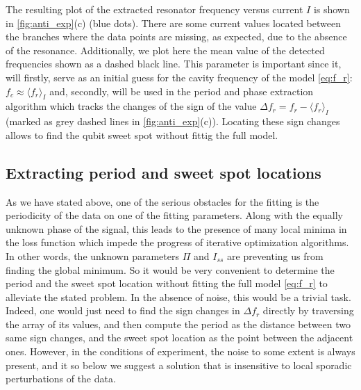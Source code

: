 \documentclass[%
 aip,
 draft,
 amsmath,amssymb,
 reprint,%
]{revtex4-1}
\begin{document}
The resulting plot of the extracted resonator frequency versus current $I$ is shown in \autoref{fig:anti_exp}(c) (blue dots). There are some current values located between the branches where the data points are missing, as expected, due to the absence of the resonance. Additionally, we plot here the mean value of the detected frequencies shown as a dashed black line. This parameter is important since it, will firstly, serve as an initial guess for the cavity frequency of the model \eqref{eq:f_r}: $f_c \approx \langle f_r \rangle_{I}$ and, secondly, will be used in the period and phase extraction algorithm which tracks the changes of the sign of the value $\Delta f_r = f_r - \langle f_r \rangle_{I}$ (marked as grey dashed lines in \autoref{fig:anti_exp}(c)). Locating these sign changes allows to find the qubit sweet spot without fittig the full model.

\subsection{Extracting period and sweet spot locations}

As we have stated above, one of the serious obstacles for the fitting is the periodicity of the data on one of the fitting parameters. Along with the equally unknown phase of the signal, this leads to the presence of many local minima in the loss function which impede the progress of iterative optimization algorithms. In other words, the unknown parameters $\Pi$ and $I_{ss}$ are preventing us from finding the global minimum. So it would be very convenient to determine the period and the sweet spot location without fitting the full model \eqref{eq:f_r} to alleviate the stated problem. In the absence of noise, this would be a trivial task. Indeed, one would just need to find the sign changes in $ \Delta f_r $ directly by traversing the array of its values, and then compute the period as the distance between two same sign changes, and the sweet spot location as the point between the adjacent ones. However, in the conditions of experiment, the noise to some extent is always present, and it  so below we suggest a solution that is insensitive to local sporadic perturbations of the data.
\end{document}
